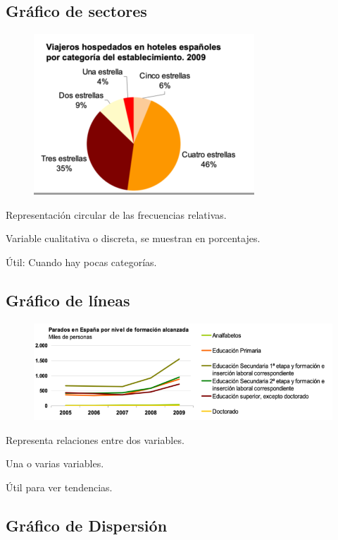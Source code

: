 \documentclass[12pt]{report} %
\begin{document}
\subsection{Gráfico de sectores}
\begin{figure}[H]
	{\includegraphics[scale=.5]{Untitled 8.png}}
\end{figure}

Representación circular de las frecuencias relativas.

Variable cualitativa o discreta, se muestran en porcentajes.

Útil: Cuando hay pocas categorías.

\subsection{Gráfico de líneas}
\begin{figure}[H]
	{\includegraphics[scale=.5]{Untitled 9.png}}
\end{figure}

Representa relaciones entre dos variables.

Una o varias variables.

Útil para ver tendencias.

\subsection{Gráfico de
Dispersión}
\end{document}
